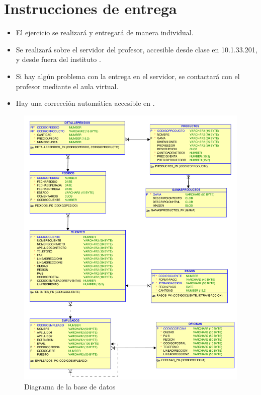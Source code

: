 \section{Instrucciones de entrega}
\begin{itemize}
\item El ejercicio se realizará y entregará de manera individual.
\item Se realizará sobre el servidor del profesor, accesible desde clase en 10.1.33.201, y desde fuera del instituto .
\item Si hay algún problema con la entrega en el servidor, se contactará con el profesor mediante el aula virtual.
\item Hay una corrección automática accesible en .
\end{itemize}



\begin{figure}[h]
  \begin{center}
    \includegraphics[width=.9\textwidth]{./jardineria.pdf}
  \end{center}
  \caption{Diagrama de la base de datos}\label{fig:esquema}
\end{figure}






